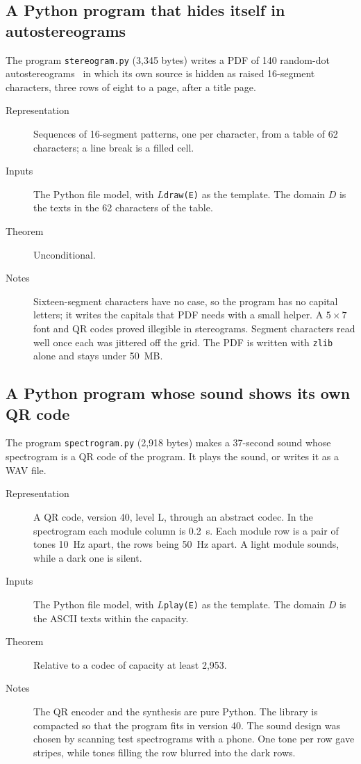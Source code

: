 \documentclass[11pt]{amsart}
\theoremstyle{definition}
\theoremstyle{remark}
\newcommand{\lean}[1]{\texttt{#1}}
\begin{document}
\subsection{A Python program that hides itself in autostereograms}
The program \lean{stereogram.py} (3,345 bytes) writes a PDF of 140 random-dot
autostereograms~\cite{Thimbleby} in which its own source is hidden as raised 16-segment characters,
three rows of eight to a page, after a title page.
\begin{description}
\item[Representation] Sequences of 16-segment patterns, one per character, from a table of 62
characters; a line break is a filled cell.
\item[Inputs] The Python file model, with $L$\verb|draw(E)| as the template. The domain $D$ is
the texts in
the 62 characters of the table.
\item[Theorem] Unconditional.
\item[Notes] Sixteen-segment characters have no case, so the program has no capital letters; it
writes the capitals that PDF needs with a small helper. A $5 \times 7$ font and QR codes proved
illegible in stereograms. Segment characters read well once each was jittered off the grid.
The PDF is written with \verb|zlib| alone and stays under 50~MB.
\end{description}

\subsection{A Python program whose sound shows its own QR code}
The program \lean{spectrogram.py} (2,918 bytes) makes a 37-second sound whose spectrogram is a QR
code of the program. It plays the sound, or writes it as a WAV file.
\begin{description}
\item[Representation] A QR code, version 40, level L, through an abstract codec. In the spectrogram
each module column is 0.2~s. Each module row is a pair of tones 10~Hz apart, the
rows being 50~Hz apart. A light module sounds, while a dark one is silent.
\item[Inputs] The Python file model, with $L$\verb|play(E)| as the template. The domain $D$ is
the ASCII texts
within the capacity.
\item[Theorem] Relative to a codec of capacity at least 2,953.
\item[Notes] The QR encoder and the synthesis are pure Python. The library is compacted so that
the program fits in version 40. The sound design was chosen by scanning test spectrograms with a
phone. One tone per row gave stripes, while tones filling the row blurred into the dark
rows.
\end{description}
\end{document}
